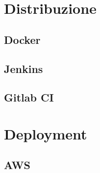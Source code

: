 \section{Distribuzione}
\subsection{Docker}
\kant[5]
\subsection{Jenkins}
\kant[5]
\subsection{Gitlab CI}
\kant[5]

\section{Deployment}
\subsection{AWS}
\kant[5]
